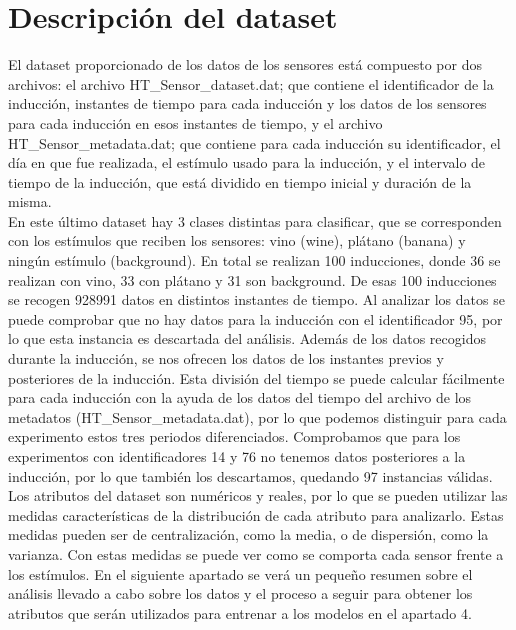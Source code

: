 \documentclass{esannV2}
\begin{document}
\section{Descripción del dataset}
El dataset proporcionado de los datos de los sensores está compuesto por dos archivos: el archivo HT\_Sensor\_dataset.dat; que contiene el identificador de la inducción, instantes de tiempo para cada inducción y los datos de los sensores para cada inducción en esos instantes de tiempo, y el archivo HT\_Sensor\_metadata.dat; que contiene para cada inducción su identificador, el día en que fue realizada, el estímulo usado para la inducción, y el intervalo de tiempo de la inducción, que está dividido en tiempo inicial y duración de la misma. \\
En este último dataset hay 3 clases distintas para clasificar, que se corresponden con los estímulos que reciben los sensores:  vino (wine), plátano (banana) y ningún estímulo (background). En total se realizan 100 inducciones, donde  36 se realizan con vino, 33 con plátano y 31 son background. De esas 100 inducciones se recogen 928991 datos en distintos instantes de tiempo. Al analizar los datos se puede comprobar que no hay datos para la inducción con el identificador 95, por lo que esta instancia es descartada del análisis. Además de los datos recogidos durante la inducción, se nos ofrecen los datos de los instantes previos y posteriores de la inducción. Esta división del tiempo se puede calcular fácilmente para cada inducción con la ayuda de los datos del tiempo del archivo de los metadatos (HT\_Sensor\_metadata.dat), por lo que podemos distinguir para cada experimento estos tres periodos diferenciados. Comprobamos que para los experimentos con identificadores 14 y 76 no tenemos datos posteriores a la inducción, por lo que también los descartamos, quedando 97 instancias válidas. \\
Los atributos del dataset son numéricos y reales, por lo que se pueden utilizar las medidas características de la distribución de cada atributo para analizarlo. Estas medidas pueden ser de centralización, como la media, o de dispersión, como la varianza. Con estas medidas se puede ver como se comporta cada sensor frente a los estímulos. En el siguiente apartado se verá un pequeño resumen sobre el  análisis llevado a cabo sobre los datos y el proceso a seguir para obtener los atributos que serán utilizados para entrenar a los modelos en el apartado 4.
\end{document}
